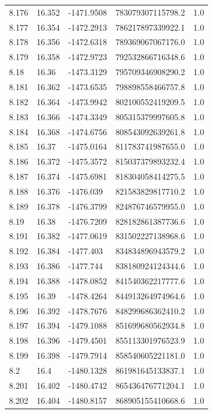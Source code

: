 \begin{tabular}{lllll}
8.176 & 16.352 & -1471.9508 & 783079307115798.2 & 1.0 \\
8.177 & 16.354 & -1472.2913 & 786217897339922.1 & 1.0 \\
8.178 & 16.356 & -1472.6318 & 789369067067176.0 & 1.0 \\
8.179 & 16.358 & -1472.9723 & 792532866716348.6 & 1.0 \\
8.18 & 16.36 & -1473.3129 & 795709346908290.2 & 1.0 \\
8.181 & 16.362 & -1473.6535 & 798898558466757.8 & 1.0 \\
8.182 & 16.364 & -1473.9942 & 802100552419209.5 & 1.0 \\
8.183 & 16.366 & -1474.3349 & 805315379997605.8 & 1.0 \\
8.184 & 16.368 & -1474.6756 & 808543092639261.8 & 1.0 \\
8.185 & 16.37 & -1475.0164 & 811783741987655.0 & 1.0 \\
8.186 & 16.372 & -1475.3572 & 815037379893232.4 & 1.0 \\
8.187 & 16.374 & -1475.6981 & 818304058414275.5 & 1.0 \\
8.188 & 16.376 & -1476.039 & 821583829817710.2 & 1.0 \\
8.189 & 16.378 & -1476.3799 & 824876746579955.0 & 1.0 \\
8.19 & 16.38 & -1476.7209 & 828182861387736.6 & 1.0 \\
8.191 & 16.382 & -1477.0619 & 831502227138968.6 & 1.0 \\
8.192 & 16.384 & -1477.403 & 834834896943579.2 & 1.0 \\
8.193 & 16.386 & -1477.744 & 838180924124344.6 & 1.0 \\
8.194 & 16.388 & -1478.0852 & 841540362217777.6 & 1.0 \\
8.195 & 16.39 & -1478.4264 & 844913264974964.6 & 1.0 \\
8.196 & 16.392 & -1478.7676 & 848299686362410.2 & 1.0 \\
8.197 & 16.394 & -1479.1088 & 851699680562934.8 & 1.0 \\
8.198 & 16.396 & -1479.4501 & 855113301976523.9 & 1.0 \\
8.199 & 16.398 & -1479.7914 & 858540605221181.0 & 1.0 \\
8.2 & 16.4 & -1480.1328 & 861981645133837.1 & 1.0 \\
8.201 & 16.402 & -1480.4742 & 865436476771204.1 & 1.0 \\
8.202 & 16.404 & -1480.8157 & 868905155410668.6 & 1.0 \\

\end{tabular}
